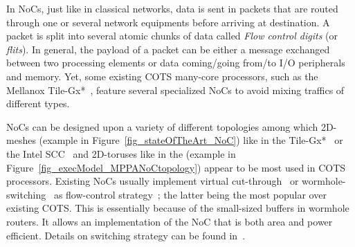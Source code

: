 \documentclass[main.tex]{subfiles}
\begin{document}
In NoCs, just like in classical networks, data is sent in packets that are
routed through one or several network equipments before arriving at
destination. A packet is split into several atomic chunks of data called
\emph{Flow control digits} (or \emph{flits}). In general, the payload of a
packet can be either a message exchanged between two processing elements or
data coming/going from/to I/O peripherals and memory. Yet, some existing COTS
many-core processors, such as the Mellanox Tile-Gx*~\cite{TileGx}, feature
several specialized NoCs to avoid mixing traffics of different types.


NoCs can be designed upon a variety of different topologies among which
2D-meshes (example in Figure~\ref{fig_stateOfTheArt_NoC}) like in the
Tile-Gx*~\cite{TileGx} or the Intel SCC~\cite{intel_scc} and 2D-toruses like in
the \mppalong (example in Figure~\ref{fig_execModel_MPPANoCtopology}) appear to
be most used in COTS processors. Existing NoCs usually implement virtual
cut-through~\cite{Kermani1979} or wormhole-switching~\cite{Dally1986} as
flow-control strategy~\cite{Ni1993}; the latter being the most popular over
existing COTS. This is essentially because of the small-sized buffers in
wormhole routers. It allows an implementation of the NoC that is both area and
power efficient. Details on switching strategy can be found in~\cite[Appendix
F]{HennessyPatterson}. 
\end{document}
